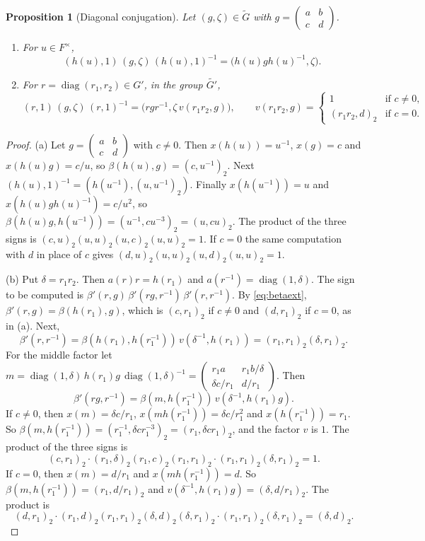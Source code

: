 \documentclass[12pt,letterpaper]{article}
\numberwithin{equation}{section}
\newtheorem{proposition}[theorem]{Proposition}
\theoremstyle{definition}
\theoremstyle{remark}
\newcommand{\Mp}{\widetilde G}
\newcommand{\diag}{\operatorname{diag}}
\newcommand{\sm}[4]{\left(\begin{smallmatrix}#1&#2\\#3&#4\end{smallmatrix}\right)}
\begin{document}
\begin{proposition}[Diagonal conjugation]\label{prop:diagconj}
Let $(g,\zeta)\in\Mp$ with $g=\sm abcd$.
\begin{enumerate}[label=(\alph*),leftmargin=2.2em]
\item For $u\in F^\times$,
\[
 (h(u),1)\,(g,\zeta)\,(h(u),1)^{-1}=\bigl(h(u)gh(u)^{-1},\zeta\bigr).
\]
\item For $r=\diag(r_1,r_2)\in G'$, in the group $\widetilde{G'}$,
\[
 (r,1)\,(g,\zeta)\,(r,1)^{-1}=\bigl(rgr^{-1},\zeta\,v(r_1r_2,g)\bigr),
 \qquad
 v(r_1r_2,g)=\begin{cases}1&\text{if } c\ne0,\\(r_1r_2,d)_2&\text{if } c=0.\end{cases}
\]
\end{enumerate}
\end{proposition}
\begin{proof}
(a)
Let $g=\sm abcd$ with $c\ne0$. Then $x(h(u))=u^{-1}$, $x(g)=c$ and $x(h(u)g)=c/u$, so $\beta(h(u),g)=(c,u^{-1})_2$. Next $(h(u),1)^{-1}=(h(u^{-1}),(u,u^{-1})_2)$. Finally $x(h(u^{-1}))=u$ and $x(h(u)gh(u)^{-1})=c/u^2$, so $\beta(h(u)g,h(u^{-1}))=(u^{-1},cu^{-3})_2=(u,cu)_2$. The product of the three signs is $(c,u)_2(u,u)_2(u,c)_2(u,u)_2=1$. If $c=0$ the same computation with $d$ in place of $c$ gives $(d,u)_2(u,u)_2(u,d)_2(u,u)_2=1$.

(b) Put $\delta=r_1r_2$. Then $a(r)r=h(r_1)$ and $a(r^{-1})=\diag(1,\delta)$. The sign to be computed is $\beta'(r,g)\,\beta'(rg,r^{-1})\,\beta'(r,r^{-1})$. By \eqref{eq:betaext}, $\beta'(r,g)=\beta(h(r_1),g)$, which is $(c,r_1)_2$ if $c\ne0$ and $(d,r_1)_2$ if $c=0$, as in (a). Next,
\[
 \beta'(r,r^{-1})=\beta(h(r_1),h(r_1^{-1}))\,v(\delta^{-1},h(r_1))=(r_1,r_1)_2(\delta,r_1)_2 .
\]
For the middle factor let $m=\diag(1,\delta)\,h(r_1)g\,\diag(1,\delta)^{-1}=\sm{r_1a}{r_1b/\delta}{\delta c/r_1}{d/r_1}$. Then
\[
 \beta'(rg,r^{-1})=\beta(m,h(r_1^{-1}))\,v(\delta^{-1},h(r_1)g).
\]
If $c\ne0$, then $x(m)=\delta c/r_1$, $x(mh(r_1^{-1}))=\delta c/r_1^2$ and $x(h(r_1^{-1}))=r_1$. So $\beta(m,h(r_1^{-1}))=(r_1^{-1},\delta cr_1^{-3})_2=(r_1,\delta cr_1)_2$, and the factor $v$ is $1$. The product of the three signs is
\[
 (c,r_1)_2\cdot(r_1,\delta)_2(r_1,c)_2(r_1,r_1)_2\cdot(r_1,r_1)_2(\delta,r_1)_2=1 .
\]
If $c=0$, then $x(m)=d/r_1$ and $x(mh(r_1^{-1}))=d$. So $\beta(m,h(r_1^{-1}))=(r_1,d/r_1)_2$ and $v(\delta^{-1},h(r_1)g)=(\delta,d/r_1)_2$. The product is
\[
 (d,r_1)_2\cdot(r_1,d)_2(r_1,r_1)_2(\delta,d)_2(\delta,r_1)_2\cdot(r_1,r_1)_2(\delta,r_1)_2=(\delta,d)_2 .
\]
\end{proof}
\end{document}
